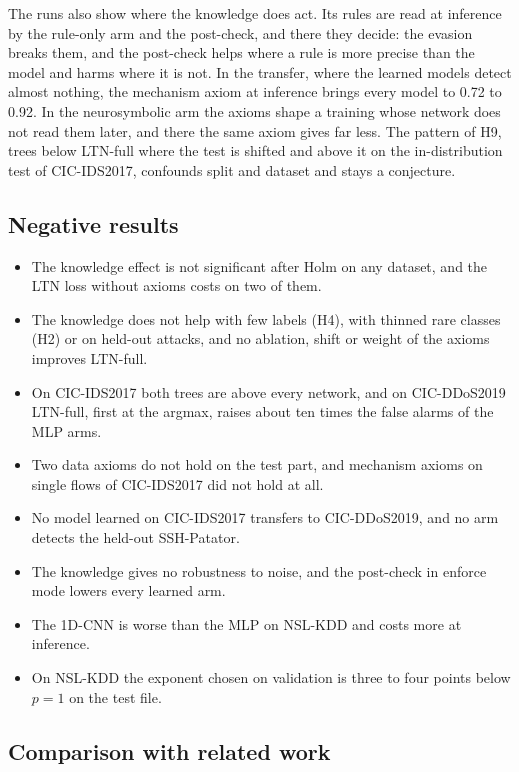 The runs also show where the knowledge does act. Its rules are read at inference by the rule-only arm and the
post-check, and there they decide: the evasion breaks them, and the post-check helps where a rule is more precise than the
model and harms where it is not. In the transfer, where the learned models detect almost nothing, the mechanism axiom at
inference brings every model to 0.72 to 0.92. In the neurosymbolic arm the axioms shape a training whose network does not
read them later, and there the same axiom gives far less. The pattern of H9, trees below LTN-full where the test is
shifted and above it on the in-distribution test of CIC-IDS2017, confounds split and dataset and stays a conjecture.

\subsection{Negative results}
\label{sec:res-negative}

\begin{itemize}
  \item The knowledge effect is not significant after Holm on any dataset, and the LTN loss without axioms costs on two of them.
  \item The knowledge does not help with few labels (H4), with thinned rare classes (H2) or on held-out attacks, and no ablation, shift or weight of the axioms improves LTN-full.
  \item On CIC-IDS2017 both trees are above every network, and on CIC-DDoS2019 LTN-full, first at the argmax, raises about ten times the false alarms of the MLP arms.
  \item Two data axioms do not hold on the test part, and mechanism axioms on single flows of CIC-IDS2017 did not hold at all.
  \item No model learned on CIC-IDS2017 transfers to CIC-DDoS2019, and no arm detects the held-out SSH-Patator.
  \item The knowledge gives no robustness to noise, and the post-check in enforce mode lowers every learned arm.
  \item The 1D-CNN is worse than the MLP on NSL-KDD and costs more at inference.
  \item On NSL-KDD the exponent chosen on validation is three to four points below $p=1$ on the test file.
\end{itemize}

\subsection{Comparison with related work}
\label{sec:res-related}


